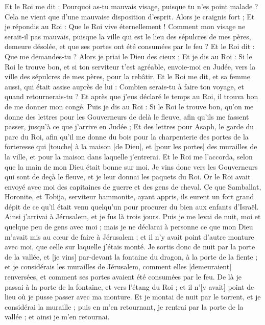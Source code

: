 \begin{multicols}{2}
Et le Roi me dit : Pourquoi as-tu mauvais visage, puisque tu n'es point malade ? Cela ne vient que d'une mauvaise disposition d'esprit. Alors je craignis fort ;
Et je répondis au Roi : Que le Roi vive éternellement ! Comment mon visage ne serait-il pas mauvais, puisque la ville qui est le lieu des sépulcres de mes pères, demeure désolée, et que ses portes ont été consumées par le feu ?
Et le Roi dit : Que me demandes-tu ? Alors je priai le Dieu des cieux ;
Et je dis au Roi : Si le Roi le trouve bon, et si ton serviteur t'est agréable, envoie-moi en Judée, vers la ville des sépulcres de mes pères, pour la rebâtir.
Et le Roi me dit, et sa femme aussi, qui était assise auprès de lui : Combien serais-tu à faire ton voyage, et quand retournerais-tu ? Et après que j'eus déclaré le temps au Roi, il trouva bon de me donner mon congé.
Puis je dis au Roi : Si le Roi le trouve bon, qu'on me donne des lettres pour les Gouverneurs de delà le fleuve, afin qu'ils me fassent passer, jusqu'à ce que j'arrive en Judée ;
Et des lettres pour Asaph, le garde du parc du Roi, afin qu'il me donne du bois pour la charpenterie des portes de la forteresse qui [touche] à la maison [de Dieu], et [pour les portes] des murailles de la ville, et pour la maison dans laquelle j'entrerai. Et le Roi me l'accorda, selon que la main de mon Dieu était bonne sur moi.
Je vins donc vers les Gouverneurs qui sont de deçà le fleuve, et je leur donnai les paquets du Roi. Or le Roi avait envoyé avec moi des capitaines de guerre et des gens de cheval.
Ce que Samballat, Horonite, et Tobija, serviteur hammonite, ayant appris, ils eurent un fort grand dépit de ce qu'il était venu quelqu'un pour procurer du bien aux enfants d'Israël.
Ainsi j'arrivai à Jérusalem, et je fus là trois jours.
Puis je me levai de nuit, moi et quelque peu de gens avec moi ; mais je ne déclarai à personne ce que mon Dieu m'avait mis au cœur de faire à Jérusalem ; et il n'y avait point d'autre monture avec moi, que celle sur laquelle j'étais monté.
Je sortis donc de nuit par la porte de la vallée, et [je vins] par-devant la fontaine du dragon, à la porte de la fiente ; et je considérais les murailles de Jérusalem, comment elles [demeuraient] renversées, et comment ses portes avaient été consumées par le feu.
De là je passai à la porte de la fontaine, et vers l'étang du Roi ; et il n'[y avait] point de lieu où je pusse passer avec ma monture.
Et je montai de nuit par le torrent, et je considérai la muraille ; puis en m'en retournant, je rentrai par la porte de la vallée ; et ainsi je m'en retournai.

\end{multicols}
